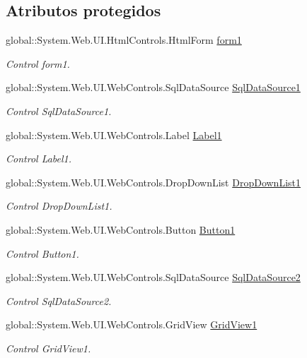 \subsection*{Atributos protegidos}
\begin{DoxyCompactItemize}
\item 
global\+::\+System.\+Web.\+U\+I.\+Html\+Controls.\+Html\+Form \mbox{\hyperlink{classInicio_1_1Profesor_1_1TareasProfesor_a9eb16c2713fc552af0f0368198a23802}{form1}}
\begin{DoxyCompactList}\small\item\em Control form1. \end{DoxyCompactList}\item 
global\+::\+System.\+Web.\+U\+I.\+Web\+Controls.\+Sql\+Data\+Source \mbox{\hyperlink{classInicio_1_1Profesor_1_1TareasProfesor_ac0c4b42b4dff451653b2c157a39b6cc9}{Sql\+Data\+Source1}}
\begin{DoxyCompactList}\small\item\em Control Sql\+Data\+Source1. \end{DoxyCompactList}\item 
global\+::\+System.\+Web.\+U\+I.\+Web\+Controls.\+Label \mbox{\hyperlink{classInicio_1_1Profesor_1_1TareasProfesor_a82ec862ecf5792f5a8a98d7bd6b9ac88}{Label1}}
\begin{DoxyCompactList}\small\item\em Control Label1. \end{DoxyCompactList}\item 
global\+::\+System.\+Web.\+U\+I.\+Web\+Controls.\+Drop\+Down\+List \mbox{\hyperlink{classInicio_1_1Profesor_1_1TareasProfesor_a15e4992e4318dc812e57d2e7e1fc4d44}{Drop\+Down\+List1}}
\begin{DoxyCompactList}\small\item\em Control Drop\+Down\+List1. \end{DoxyCompactList}\item 
global\+::\+System.\+Web.\+U\+I.\+Web\+Controls.\+Button \mbox{\hyperlink{classInicio_1_1Profesor_1_1TareasProfesor_adb0d86a1ae5a053280690046a8f02dd3}{Button1}}
\begin{DoxyCompactList}\small\item\em Control Button1. \end{DoxyCompactList}\item 
global\+::\+System.\+Web.\+U\+I.\+Web\+Controls.\+Sql\+Data\+Source \mbox{\hyperlink{classInicio_1_1Profesor_1_1TareasProfesor_a8cd37a2e5689f618468f816fd81b6334}{Sql\+Data\+Source2}}
\begin{DoxyCompactList}\small\item\em Control Sql\+Data\+Source2. \end{DoxyCompactList}\item 
global\+::\+System.\+Web.\+U\+I.\+Web\+Controls.\+Grid\+View \mbox{\hyperlink{classInicio_1_1Profesor_1_1TareasProfesor_aa707588e2b61d0f1dd760bcf6551d1dd}{Grid\+View1}}
\begin{DoxyCompactList}\small\item\em Control Grid\+View1. \end{DoxyCompactList}\end{DoxyCompactItemize}


